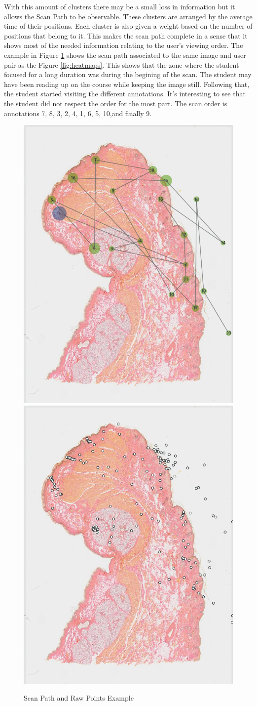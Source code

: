 \documentclass[a4paper,11pt]{report}
\numberwithin{figure}{section} %
\begin{document}
\begin{itemize}
        With this amount of clusters there may be a small loss in information but it allows the Scan Path to be observable.
        These clusters are arranged by the average time of their positions.
        Each cluster is also given a weight based on the number of positions that belong to it.
        This makes the scan path complete in a sense that it shows most of the needed information relating to the user's viewing order.
        The example in Figure \ref{fig:scanpath} shows the scan path associated to the same image and user pair as the Figure \ref{fig:heatmaps}.
        This shows that the zone where the student focused for a long duration was during the begining of the scan.
        The student may have been reading up on the course while keeping the image still.
        Following that, the student started visiting the different annotations.
        It's interesting to see that the student did not respect the order for the most part.
        The scan order is annotations 7, 8, 3, 2, 4, 1, 6, 5, 10,and finally 9.
          \begin{figure}[H]
          \centering
          \includegraphics[width=.3\linewidth]{images/5501147_scanpath.png} \includegraphics[width=.3\linewidth]{images/5501147_points.png}
          \caption{Scan Path and Raw Points Example}
          \label{fig:scanpath}
    \end{figure}
    \end{itemize}
\end{document}

